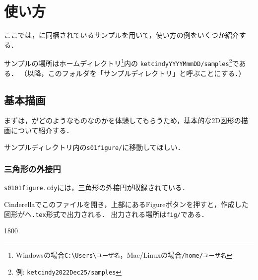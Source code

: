 
\chapter{使い方}

ここでは，{\ketcindy}に同梱されているサンプルを用いて，使い方の例をいくつか紹介する．

サンプルの場所はホームディレクトリ\footnote{Windowsの場合\verb|C:\Users\ユーザ名|，Mac/Linuxの場合\verb|/home/ユーザ名|}内の
\verb|ketcindyYYYYMmmDD/samples|\footnote{例: \verb|ketcindy2022Dec25/samples|}である．
（以降，このフォルダを「サンプルディレクトリ」と呼ぶことにする．）

\section{基本描画}
まずは，{\ketcindy}がどのようなものなのかを体験してもらうため，基本的な2D図形の描画について紹介する．

サンプルディレクトリ内の\verb|s01figure/|に移動してほしい．

\subsection{三角形の外接円}
\verb|s0101figure.cdy|には，三角形の外接円が収録されている．

Cinderellaでこのファイルを開き，上部にあるFigureボタンを押すと，作成した図形がへ\verb|.tex|形式で出力される．
出力される場所は\verb|fig/|である．

\begin{layer}{180}{0}
\end{layer}
